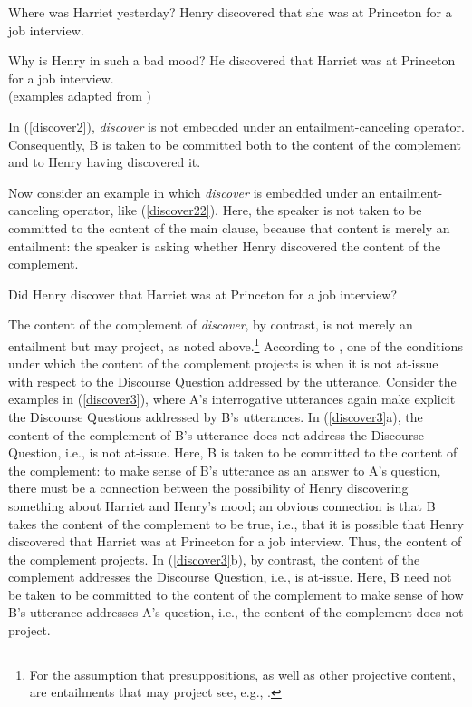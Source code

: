 \documentclass[11pt,fleqn]{article}
\newcommand{\6}{\mbox{$[\hspace*{-.6mm}[$}}
\newcommand{\9}{\mbox{$]\hspace*{-.6mm}]$}}
\begin{document}
\begin{exe}
\ex\label{discover2}
\begin{xlist}
\ex
\begin{xlist}
 Where was Harriet yesterday?
 Henry discovered that she was at Princeton for a job interview.
\end{xlist}

\ex
\begin{xlist}
 Why is Henry in such a bad mood?
 He discovered that Harriet was at Princeton for a job interview.
\\ \hspace*{.2cm} \hfill (examples adapted from \citealt[1035]{simons07})
\end{xlist}

\end{xlist}
\end{exe}
In (\ref{discover2}), {\em discover} is not embedded under an entailment-canceling operator. Consequently, B is taken to be committed  both to the content of the complement and to Henry having discovered it. 

Now consider an example in which {\em discover} is embedded under an entailment-canceling operator, like (\ref{discover22}). Here, the speaker is not taken to be committed to the content of the main clause, because that content is merely an entailment: the speaker is asking whether Henry discovered the content of the complement.

\begin{exe}
\ex\label{discover22} Did Henry discover that Harriet was at Princeton for a job interview?
\end{exe}
The content of the complement of {\em discover}, by contrast, is not merely an entailment but may project, as noted above.\footnote{For the assumption that presuppositions, as well as other projective content, are entailments that may project see, e.g., \citealt{gazdar79b,barker02,schlenker10,abrusan2011,abrusan2016,anand-hacquard2014}. } According to \citealt{best-question}, one of the conditions under which the content of the complement projects is when it is not at-issue with respect to the Discourse Question addressed by the utterance. Consider the examples in (\ref{discover3}), where A's interrogative utterances again make explicit the Discourse Questions addressed by B's utterances. In (\ref{discover3}a), the content of the complement of B's utterance does not address the Discourse Question, i.e., is not at-issue. Here, B is taken to be committed to the content of the complement: to make sense of B's utterance as an answer to A's question, there must be a connection between the possibility of Henry discovering something about Harriet and Henry's mood; an obvious connection is that B takes the content of the complement to be true, i.e., that it is possible that Henry discovered that Harriet was at Princeton for a job interview. Thus, the content of the complement projects. In (\ref{discover3}b), by contrast, the content of the complement addresses the Discourse Question, i.e., is at-issue. Here, B need not be taken to be committed to the content of the complement to make sense of how B's utterance addresses A's question, i.e., the content of the complement does not project.
\end{document}
